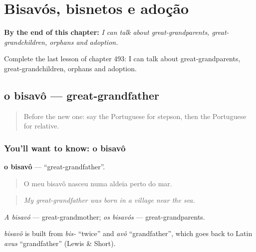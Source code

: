 
\chapter{Bisavós, bisnetos e adoção}
\label{ch:pt-bisavos-bisnetos-e-adocao}

\begin{chapteropening}
\textbf{By the end of this chapter:} \emph{I can talk about great-grandparents, great-grandchildren, orphans and adoption.}

Complete the last lesson of chapter 493: I can talk about great-grandparents, great-grandchildren, orphans and adoption.
\end{chapteropening}

\section[o bisavô]{o bisavô — great-grandfather}

\label{lesson:PT-C493-bisavo}



\begin{quote}
Before the new one: say the Portuguese for stepson, then the Portuguese for relative.
\end{quote}

\subsection*{You'll want to know: o bisavô}
\textbf{o bisavô} — \textquotedblleft{}great-grandfather\textquotedblright{}.

\begin{quote}
O meu bisavô nasceu numa aldeia perto do mar.
\end{quote}

\begin{quote}
\emph{My great-grandfather was born in a village near the sea.}
\end{quote}

\emph{A bisavó} — great-grandmother; \emph{os bisavós} — great-grandparents.

\begin{cousinweb}
\emph{bisavô} is built from \emph{bis-} \textquotedblleft{}twice\textquotedblright{} and \emph{avô} \textquotedblleft{}grandfather\textquotedblright{}, which goes back to Latin \emph{avus} \textquotedblleft{}grandfather\textquotedblright{} (Lewis \& Short).
\end{cousinweb}

